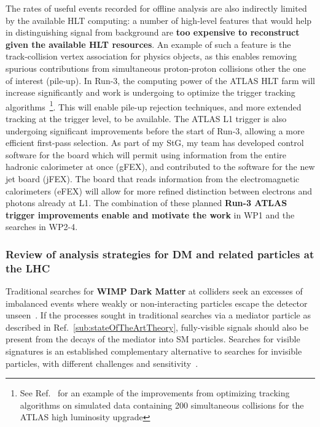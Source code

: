 The rates of useful events recorded for offline analysis are also indirectly limited by the available HLT computing: 
a number of high-level features that would help in distinguishing signal from background are \textbf{too expensive to reconstruct given the available HLT resources}. 
An example of such a feature is the track-collision vertex association for physics objects, 
as this enables removing spurious contributions from simultaneous proton-proton collisions other the one of interest (pile-up). 
In Run-3, the computing power of the ATLAS HLT farm will increase significantly and work is undergoing to optimize the trigger tracking algorithms~\footnote{See 
Ref.~\cite{ToBeCited} %
for an example of the improvements from optimizing tracking algorithms on simulated data containing 200 simultaneous collisions for the ATLAS high luminosity upgrade}. 
This will enable pile-up rejection techniques, and more extended tracking at the trigger level, to be available. 
The ATLAS L1 trigger is also undergoing significant improvements before the start of Run-3, allowing a more efficient first-pass selection.  
As part of my StG, my team has developed control software for the board which will permit using information from the entire hadronic calorimeter at once (gFEX), 
and contributed to the software for the new jet board (jFEX). 
The board that reads information from the electromagnetic calorimeters (eFEX) will allow for more refined distinction between electrons and photons already at L1. 
The combination of these planned \textbf{Run-3 ATLAS trigger improvements enable and motivate the work} in WP1 and the searches in WP2-4. 

\subsubsection{Review of analysis strategies for DM and related particles at the LHC}

Traditional searches for \textbf{WIMP Dark Matter} at colliders seek an excesses of imbalanced events where weakly or non-interacting particles escape the detector unseen~\cite{Boveia:2018yeb}. 
If the processes sought in traditional searches via a mediator particle as described in Ref.~\ref{sub:stateOfTheArtTheory}, 
fully-visible signals should also be present from the decays of the mediator into SM particles. 
Searches for visible signatures is an established complementary alternative to searches for invisible particles, with different challenges and sensitivity~\cite{ToBeCited}.%

